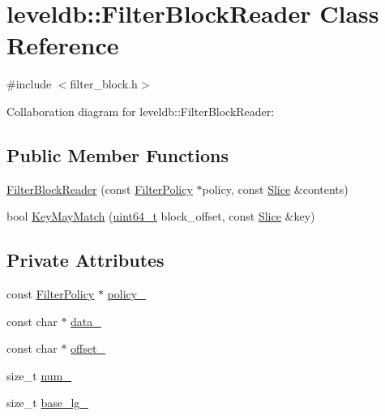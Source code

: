 \hypertarget{classleveldb_1_1_filter_block_reader}{\section{leveldb\-:\-:Filter\-Block\-Reader Class Reference}
\label{classleveldb_1_1_filter_block_reader}
}


{\ttfamily \#include $<$filter\-\_\-block.\-h$>$}



Collaboration diagram for leveldb\-:\-:Filter\-Block\-Reader\-:
\subsection*{Public Member Functions}
\begin{DoxyCompactItemize}
\item 
\hyperlink{classleveldb_1_1_filter_block_reader_a02e9203af5314959ad99057f0020c406}{Filter\-Block\-Reader} (const \hyperlink{classleveldb_1_1_filter_policy}{Filter\-Policy} $\ast$policy, const \hyperlink{classleveldb_1_1_slice}{Slice} \&contents)
\item 
bool \hyperlink{classleveldb_1_1_filter_block_reader_a2c1c0cd8311b99fd92d3548b7aa240d0}{Key\-May\-Match} (\hyperlink{stdint_8h_aaa5d1cd013383c889537491c3cfd9aad}{uint64\-\_\-t} block\-\_\-offset, const \hyperlink{classleveldb_1_1_slice}{Slice} \&key)
\end{DoxyCompactItemize}
\subsection*{Private Attributes}
\begin{DoxyCompactItemize}
\item 
const \hyperlink{classleveldb_1_1_filter_policy}{Filter\-Policy} $\ast$ \hyperlink{classleveldb_1_1_filter_block_reader_a4010e6ad3e0aff23a10260eae3669cdd}{policy\-\_\-}
\item 
const char $\ast$ \hyperlink{classleveldb_1_1_filter_block_reader_a8bbb336aa6b2a278e276aae0420e9376}{data\-\_\-}
\item 
const char $\ast$ \hyperlink{classleveldb_1_1_filter_block_reader_a64ae9da0d51b09f6d6c23723f486e0e0}{offset\-\_\-}
\item 
size\-\_\-t \hyperlink{classleveldb_1_1_filter_block_reader_a6805c65b69099abe85ec0863bdaf9842}{num\-\_\-}
\item 
size\-\_\-t \hyperlink{classleveldb_1_1_filter_block_reader_a973563cd3780b9be717a8b60096ed232}{base\-\_\-lg\-\_\-}
\end{DoxyCompactItemize}


